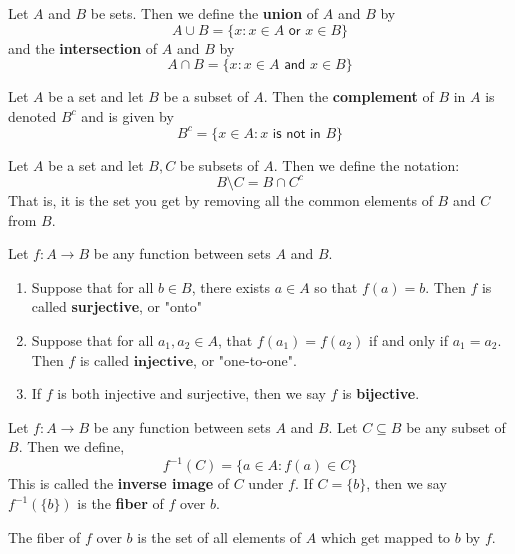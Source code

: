 \begin{defn} Let $A$ and $B$ be sets. Then we define the \textbf{union} of $A$ and $B$ by
\[A\cup B = \{x : x \in A \textsf{ or }x \in B\}\]
and the \textbf{intersection} of $A$ and $B$ by
\[A\cap B = \{x : x \in A \textsf{ and }x \in B\}\]  
\end{defn}
\begin{defn}
    Let $A$ be a set and let $B$ be a subset of $A$. Then the \textbf{complement} of $B$ in $A$ is denoted $B^c$ and is given by
    \[B^c = \{x \in A : x \textsf{ is not in } B\}\]
\end{defn}
\begin{defn}
Let $A$ be a set and let $B,C$ be subsets of $A$. Then we define the notation:
\[B\setminus C = B\cap C^c\]
That is, it is the set you get by removing all the common elements of $B$ and $C$ from $B$.
\end{defn}
\begin{defn}
    Let $f : A \to B$ be any function between sets $A$ and $B$. 
    \begin{enumerate}
    \item {
        Suppose that for all $b \in B$, there exists $a \in A$ so that $f(a)=b$. Then $f$ is called \textbf{surjective}, or "onto"
    }
    \item {
        Suppose that for all $a_1,a_2 \in A$, that $f(a_1)=f(a_2)$ if and only if $a_1=a_2$. Then $f$ is called $\textbf{injective}$, or "one-to-one".
    }
    \item {
        If $f$ is both injective and surjective, then we say $f$ is \textbf{bijective}.
    }
    \end{enumerate}
\end{defn}

\begin{defn}
    Let $f : A \to B$ be any function between sets $A$ and $B$. Let $C\subseteq B$ be any subset of $B$. Then we define,
    \begin{equation}
        f^{-1}(C) = \{a \in A : f(a)\in C\}
    \end{equation}
    This is called the \textbf{inverse image} of $C$ under $f$. If $C = \{b\}$, then we say $f^{-1}(\{b\})$ is the \textbf{fiber} of $f$ over $b$. 
\end{defn}
The fiber of $f$ over $b$ is the set of all elements of $A$ which get mapped to $b$ by $f$.


